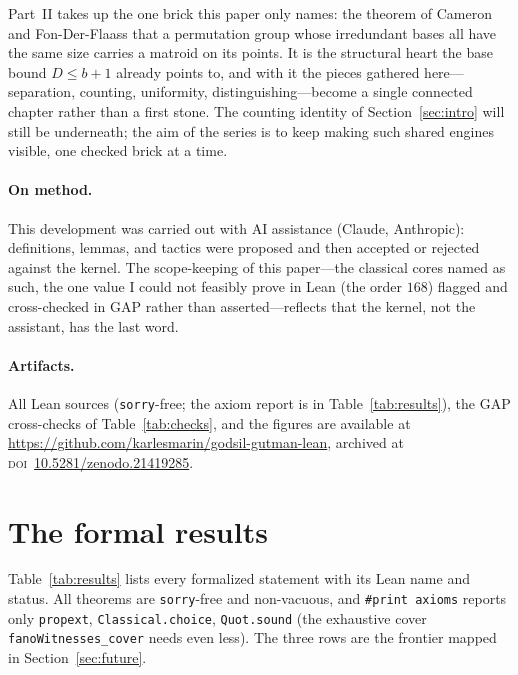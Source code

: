 \documentclass[11pt]{article}
\newcommand{\lean}[1]{\texttt{#1}}
\begin{document}
Part~II takes up the one brick this paper only names: the theorem of Cameron and
Fon-Der-Flaass that a permutation group whose irredundant bases all have the same
size carries a matroid on its points. It is the structural heart the base bound
$D\le b+1$ already points to, and with it the pieces gathered here---separation,
counting, uniformity, distinguishing---become a single connected chapter rather
than a first stone. The counting identity of Section~\ref{sec:intro} will still be
underneath; the aim of the series is to keep making such shared engines visible,
one checked brick at a time.

\paragraph{On method.} This development was carried out with AI assistance
(Claude, Anthropic): definitions, lemmas, and tactics were proposed and then
accepted or rejected against the kernel. The scope-keeping of this paper---the
classical cores named as such, the one value I could not feasibly prove in Lean
(the order $168$) flagged and cross-checked in GAP rather than asserted---reflects
that the kernel, not the assistant, has the last word.

\paragraph{Artifacts.} All Lean sources (\lean{sorry}-free; the axiom report is in
Table~\ref{tab:results}), the GAP cross-checks of Table~\ref{tab:checks}, and the
figures are available at
\url{https://github.com/karlesmarin/godsil-gutman-lean}, archived at
\textsc{doi}~\href{https://doi.org/10.5281/zenodo.21419285}{10.5281/zenodo.21419285}.

\appendix
\section{The formal results}
\label{app:results}

Table~\ref{tab:results} lists every formalized statement with its Lean name and
status. All theorems are \lean{sorry}-free and non-vacuous, and \lean{\#print
axioms} reports only \lean{propext}, \lean{Classical.choice}, \lean{Quot.sound}
(the exhaustive cover \lean{fanoWitnesses\_cover} needs even less). The three
\stfuture{} rows are the frontier mapped in Section~\ref{sec:future}.
\end{document}
